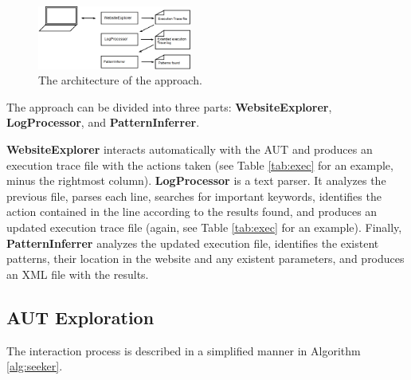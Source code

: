 \documentclass[conference]{IEEEtran}
\begin{document}
\begin{figure}[!htb]
\centering
\includegraphics[width=0.45\textwidth]{retool}
\caption{The architecture of the approach.}
\label{fig:retool}
\end{figure}



The approach can be divided into three parts: \textbf{WebsiteExplorer}, \textbf{LogProcessor}, and \textbf{PatternInferrer}.

\textbf{WebsiteExplorer} interacts automatically with the AUT and produces an execution trace file with the actions taken (see Table \ref{tab:exec} for an example, minus the rightmost column). \textbf{LogProcessor} is a text parser. It analyzes the previous file, parses each line, searches for important keywords, identifies the action contained in the line according to the results found, and produces an updated execution trace file (again, see Table \ref{tab:exec} for an example). Finally, \textbf{PatternInferrer} analyzes the updated execution file, identifies the existent patterns, their location in the website and any existent parameters, and produces an XML file with the results.

\subsection{AUT Exploration}\label{sec:inter}
The interaction process is described in a simplified manner in Algorithm \ref{alg:seeker}.
\end{document}
